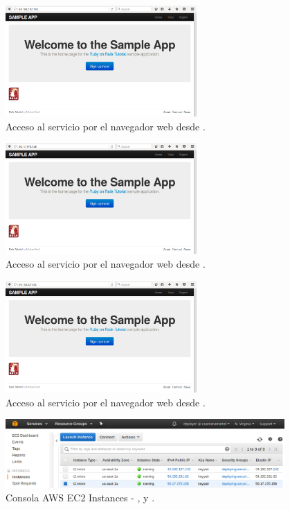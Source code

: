 \begin{figure}[H]
\centering
\includegraphics[width=0.65\textwidth]{images/figures/nav-1.png}
\caption{Acceso al servicio por el navegador web desde .}
\end{figure}

\begin{figure}[H]
\centering
\includegraphics[width=0.65\textwidth]{images/figures/nav-2.png}
\caption{Acceso al servicio por el navegador web desde .}
\end{figure}

\begin{figure}[H]
\centering
\includegraphics[width=0.65\textwidth]{images/figures/nav-3.png}
\caption{Acceso al servicio por el navegador web desde .}
\end{figure}

\begin{figure}[H]
\centering
\includegraphics[width=0.95\textwidth]{images/figures/aws-console-3.png}
\caption{Consola AWS EC2 Instances - ,  y .}
\end{figure}

